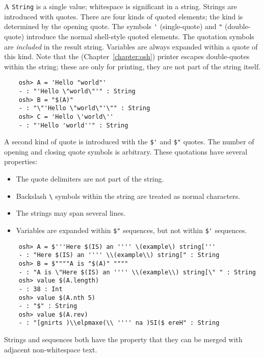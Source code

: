 A \verb+String+ is a single value; whitespace is significant in a string.  Strings are introduced
with quotes.  There are four kinds of quoted elements; the kind is determined by the opening quote.
The symbols \verb+'+ (single-quote) and \verb+"+ (double-quote) introduce the normal shell-style
quoted elements.  The quotation symbols are \emph{included} in the result string.  Variables are
always expanded within a quote of this kind.  Note that the 
(Chapter~\ref{chapter:osh}) printer
escapes double-quotes within the string; these are only for printing, they are not part of the
string itself.

\begin{verbatim}
    osh> A = 'Hello "world"'
    - : "'Hello \"world\"'" : String
    osh> B = "$(A)"
    - : "\"'Hello \"world\"'\"" : String
    osh> C = 'Hello \'world\''
    - : "'Hello 'world''" : String
\end{verbatim}

A second kind of quote is introduced with the \verb+$'+ and \verb+$"+
quotes.  The number of opening and closing quote symbols is arbitrary.
These quotations have several properties:
\begin{itemize}
\item The quote delimiters are not part of the string.
\item Backslash \verb+\+ symbols within the string are treated as normal characters.
\item The strings may span several lines.
\item Variables are expanded within \verb+$"+ sequences, but not within \verb+$'+
  sequences.
\end{itemize}

\begin{verbatim}
    osh> A = $'''Here $(IS) an '''' \(example\) string['''
    - : "Here $(IS) an '''' \\(example\\) string[" : String
    osh> B = $""""A is "$(A)" """"
    - : "A is \"Here $(IS) an '''' \\(example\\) string[\" " : String
    osh> value $(A.length)
    - : 38 : Int
    osh> value $(A.nth 5)
    - : "$" : String
    osh> value $(A.rev)
    - : "[gnirts )\\elpmaxe(\\ '''' na )SI($ ereH" : String
\end{verbatim}

Strings and sequences both have the property that they can be merged
with adjacent non-whitespace text.

